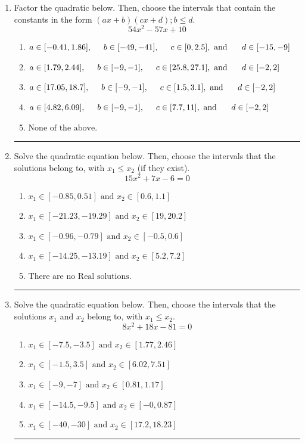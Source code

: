 \documentclass[14pt]{extbook}
\newcommand{\litem}[1]{\item#1\hspace*{-1cm}\rule{\textwidth}{0.4pt}}
\begin{document}
\begin{enumerate}
{\begin{enumerate}[label=\Alph*.]
\end{enumerate} }
\litem{
Factor the quadratic below. Then, choose the intervals that contain the constants in the form $(ax+b)(cx+d); b \leq d.$\[ 54x^{2} -57 x + 10 \]\begin{enumerate}[label=\Alph*.]
\item \( a \in [-0.41, 1.86], \hspace*{5mm} b \in [-49, -41], \hspace*{5mm} c \in [0, 2.5], \text{ and } \hspace*{5mm} d \in [-15, -9] \)
\item \( a \in [1.79, 2.44], \hspace*{5mm} b \in [-9, -1], \hspace*{5mm} c \in [25.8, 27.1], \text{ and } \hspace*{5mm} d \in [-2, 2] \)
\item \( a \in [17.05, 18.7], \hspace*{5mm} b \in [-9, -1], \hspace*{5mm} c \in [1.5, 3.1], \text{ and } \hspace*{5mm} d \in [-2, 2] \)
\item \( a \in [4.82, 6.09], \hspace*{5mm} b \in [-9, -1], \hspace*{5mm} c \in [7.7, 11], \text{ and } \hspace*{5mm} d \in [-2, 2] \)
\item \( \text{None of the above.} \)

\end{enumerate} }
\litem{
Solve the quadratic equation below. Then, choose the intervals that the solutions belong to, with $x_1 \leq x_2$ (if they exist).\[ 15x^{2} +7 x -6 = 0 \]\begin{enumerate}[label=\Alph*.]
\item \( x_1 \in [-0.85, 0.51] \text{ and } x_2 \in [0.6, 1.1] \)
\item \( x_1 \in [-21.23, -19.29] \text{ and } x_2 \in [19, 20.2] \)
\item \( x_1 \in [-0.96, -0.79] \text{ and } x_2 \in [-0.5, 0.6] \)
\item \( x_1 \in [-14.25, -13.19] \text{ and } x_2 \in [5.2, 7.2] \)
\item \( \text{There are no Real solutions.} \)

\end{enumerate} }
\litem{
Solve the quadratic equation below. Then, choose the intervals that the solutions $x_1$ and $x_2$ belong to, with $x_1 \leq x_2$.\[ 8x^{2} +18 x -81 = 0 \]\begin{enumerate}[label=\Alph*.]
\item \( x_1 \in [-7.5, -3.5] \text{ and } x_2 \in [1.77, 2.46] \)
\item \( x_1 \in [-1.5, 3.5] \text{ and } x_2 \in [6.02, 7.51] \)
\item \( x_1 \in [-9, -7] \text{ and } x_2 \in [0.81, 1.17] \)
\item \( x_1 \in [-14.5, -9.5] \text{ and } x_2 \in [-0, 0.87] \)
\item \( x_1 \in [-40, -30] \text{ and } x_2 \in [17.2, 18.23] \)


\end{enumerate}}
\end{enumerate}
\end{document}
